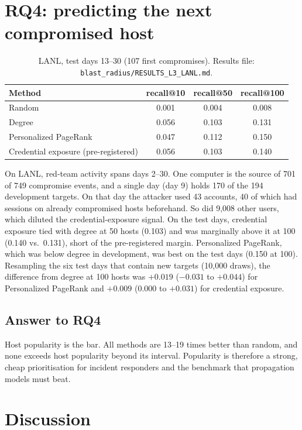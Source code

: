 \documentclass[acmlarge,screen,review]{acmart}
\begin{document}
\section{RQ4: predicting the next compromised host}\label{sec:rq4}
\begin{table}[!htbp]
\centering\small
\caption{LANL, test days 13--30 (107 first compromises). Results file: \texttt{blast\_radius/RESULTS\_L3\_LANL.md}.}
\label{tab:rq4}
\begin{tabular}{lccc}
\toprule
Method & recall@10 & recall@50 & recall@100 \\
\midrule
Random & 0.001 & 0.004 & 0.008 \\
Degree & 0.056 & 0.103 & 0.131 \\
Personalized PageRank & 0.047 & 0.112 & 0.150 \\
Credential exposure (pre-registered) & 0.056 & 0.103 & 0.140 \\
\bottomrule
\end{tabular}
\end{table}

On LANL, red-team activity spans days 2--30. One computer is the source of 701 of 749 compromise events, and a
single day (day 9) holds 170 of the 194 development targets. On that day the attacker used 43 accounts, 40 of which
had sessions on already compromised hosts beforehand. So did 9{,}008 other users, which diluted the
credential-exposure signal. On the test days, credential exposure tied with degree at 50 hosts (0.103) and was
marginally above it at 100 (0.140 vs.\ 0.131), short of the pre-registered margin. Personalized PageRank, which was below degree in
development, was best on the test days (0.150 at 100). Resampling the six test days that contain new targets
(10{,}000 draws), the difference from degree at 100 hosts was $+0.019$
($-0.031$ to $+0.044$) for Personalized PageRank and $+0.009$ (0.000 to $+0.031$) for credential exposure. 

\subsection{Answer to RQ4}
Host popularity is the bar. All methods are 13--19 times better than random, and none exceeds host popularity
beyond its interval. Popularity is therefore a strong, cheap prioritisation for incident responders and the
benchmark that propagation models must beat.

\section{Discussion}\label{sec:discussion}
\end{document}
